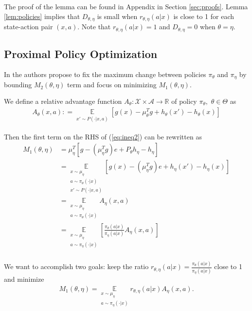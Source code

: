 \documentclass[11pt]{article}
\newcommand{\R}{\mathbb{R}}
\newcommand{\E}{\mathbb{E}}
\newcommand{\X}{\mathcal{X}}
\newcommand{\A}{\mathcal{A}}
\theoremstyle{definition}
\numberwithin{equation}{section}
\begin{document}
The proof of the lemma can be found in Appendix in Section \ref{sec:proofs}. Lemma \ref{lem:policies} implies that $D_{\theta, \eta}$ is small when $r_{\theta, \eta}(a|x)$ is close to 1 for each state-action pair $(x, a)$. Note that  $r_{\theta, \eta}(a|x) = 1$ and $D_{\theta, \eta}=0$ when $\theta=\eta.$
\subsection{Proximal Policy Optimization}
 
 


In  \cite{Kakade2002, Schulman2015} the authors propose to  fix the maximum change between policies $\pi_\theta$ and $\pi_{\eta}$ by bounding $M_2(\theta, \eta)$ term and focus  on minimizing $M_1(\theta, \eta)$.



We define a relative advantage function $A_{\theta}:\X\times \A\rightarrow \R$ of policy $\pi_\theta, $ $\theta\in \Theta$ as 
\begin{align}\label{eq:A}
	A_{\theta}(x, a): =   \underset{\substack{ x'\sim P(\cdot|x, a)}  }{\E} \left[g(x) - \mu_\theta^T g + h_{\theta} (x') -h_{\theta} (x) \right]                 
\end{align}
 

Then the first term on the RHS of   (\ref{eq:ineq2}) can be rewritten as
\begin{align}\label{eq:MA}
M_1(\theta, \eta) & =  \mu_{\eta}^T[ g -(\mu_\eta^Tg) e   +P_{\theta}h_{\eta} - h_{\eta} ]\\
 & =  \underset{\substack{ x\sim \mu_{\eta}\\ a\sim \pi_{\theta}(\cdot|x) \\ x'\sim P(\cdot|x, a)}  }{\E} \left[    g(x ) -(\mu_\eta^Tg) e   + h_{\eta}(x') - h_{\eta}(x)   \right]  \nonumber\\         
 &=  \underset{\substack{ x\sim \mu_{\eta}\\ a\sim \pi_{\theta}(\cdot|x)  }  }{\E} A_{\eta} (x, a)\nonumber\\
	& =  \underset{\substack{ x\sim \mu_{\eta}\\ a\sim \pi_{\eta}(\cdot|x)  }  }{\E} \left[ \frac{\pi_{\theta}(a|x)}{\pi_{\eta}(a|x)}A_{ \eta} (x, a) \right]\nonumber\\  \nonumber  
 \end{align}


 


We want to accomplish two goals: keep the ratio $r_{\theta, \eta}(a|x) =\frac{\pi_{\theta}(a|x)}{\pi_{\eta}(a|x)} $ close to 1 and minimize    \begin{align*}M_1(\theta, \eta) =  \underset{\substack{ x\sim \mu_{\eta}\\ a\sim \pi_{\eta}(\cdot|x)  }  }{\E}  r_{\theta, \eta}(a|x)A_{\eta} (x, a).\end{align*}
\end{document}
